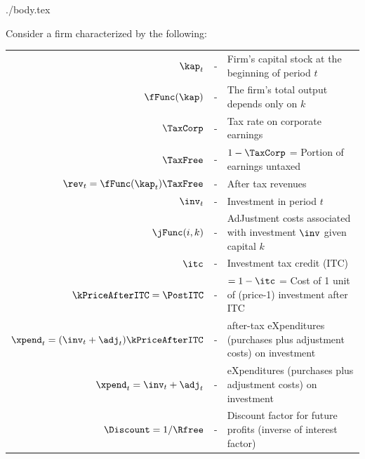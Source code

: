 \documentclass{handout}
\begin{document}
\begin{verbatimwrite}{./body.tex}

\newcommand{\ifTax}{\ifthenelse{\boolean{Taxes}}}

Consider a firm characterized by the following:
\begin{center}
\begin{tabular}{rcl}
   $\kap_{t}      $      & - & Firm's capital stock at the beginning of period $t$
\\ $\fFunc(\kap)     $ & - & The firm's total output depends only on $k$
\ifTax{\\ $\TaxCorp $ & - & Tax rate on corporate earnings
\\ $\TaxFree$  & - & $1-\TaxCorp$ = Portion of earnings untaxed
\\ $\rev_{t} = \fFunc(\kap_{t})\TaxFree   $ & - & After tax revenues
}{}
\\ $\inv_{t}      $ & - & Investment in period $t$
\\ $\jFunc(i,k)      $ & - & AdJustment costs associated with investment $\inv$ given capital $k$
\ifTax{\\ $\itc$    & - & Investment tax credit (ITC)
\\ $\kPriceAfterITC=\PostITC$    & - & $=1-\itc$ = Cost of 1 unit of (price-1) investment after ITC
\\ $\xpend_{t} = (\inv_{t}+\adj_{t})\kPriceAfterITC $  & - & after-tax eXpenditures (purchases plus adjustment costs) on investment
}{\\ $\xpend_{t} = \inv_{t}+\adj_{t}  $  & - & eXpenditures (purchases plus adjustment costs) on investment}
\\ $\Discount=1/\Rfree     $ & - & Discount factor for future profits (inverse of interest factor)
\end{tabular}
\end{center}


\end{verbatimwrite}
\end{document}
